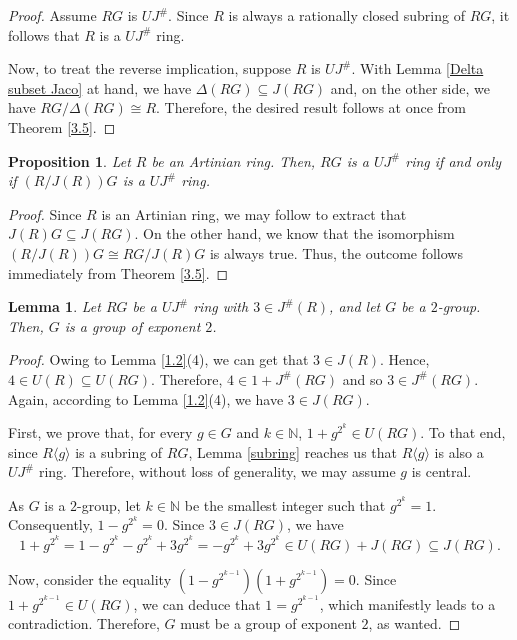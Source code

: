 \documentclass[12pt]{amsart}
\newtheorem{proposition}[theorem]{Proposition}
\newtheorem{lemma}[theorem]{Lemma}
\theoremstyle{definition}
\begin{document}
\begin{proof}
Assume $RG$ is $UJ^{\#}$. Since $R$ is always a rationally closed subring of $RG$, it follows that $R$ is a $UJ^{\#}$ ring. 

Now, to treat the reverse implication, suppose $R$ is $UJ^{\#}$. With Lemma \ref{Delta subset Jaco} at hand, we have $\Delta(RG) \subseteq J(RG)$ and, on the other side, we have $RG/\Delta(RG) \cong R$. Therefore, the desired result follows at once from Theorem \ref{3.5}.
\end{proof}

\begin{proposition}
Let $R$ be an Artinian ring. Then, $RG$ is a $UJ^{\#}$ ring if and only if $(R/J(R))G$ is a $UJ^{\#}$ ring.
\end{proposition}

\begin{proof}
Since $R$ is an Artinian ring, we may follow \cite[Proposition 3]{con} to extract that $J(R)G\subseteq J(RG)$. On the other hand, we know that the isomorphism $(R/J(R))G\cong RG/J(R)G$ is always true. Thus, the outcome follows immediately from Theorem \ref {3.5}.
\end{proof}

\begin{lemma}
Let $RG$ be a $UJ^{\#}$ ring with $3 \in J^{\#}(R)$, and let $G$ be a $2$-group. Then, $G$ is a group of exponent $2$.
\end{lemma}

\begin{proof}
Owing to Lemma \ref{1.2}(4), we can get that $3 \in J(R)$. Hence, $4\in U(R)\subseteq U(RG)$. Therefore, $4\in 1+J^{\#}(RG)$ and so $3\in J^{\#}(RG)$. Again, according to Lemma \ref{1.2}(4), we have $3\in J(RG)$.
	
First, we prove that, for every $g \in G$ and $k \in \mathbb{N}$, $1+g^{2^k} \in U(RG)$. To that end, since $R\langle g\rangle$ is a subring of $RG$, Lemma \ref{subring} reaches us that $R\langle g\rangle$ is also a $UJ^{\#}$ ring. Therefore, without loss of generality, we may assume $g$ is central.
	
As $G$ is a $2$-group, let $k \in \mathbb{N}$ be the smallest integer such that $g^{2^k}=1$. Consequently, $1-g^{2^k}=0$. Since $3 \in J(RG)$, we have
\[
	1+g^{2^k} = 1-g^{2^k} - g^{2^k} + 3g^{2^k} = -g^{2^k} + 3g^{2^k} \in U(RG) + J(RG) \subseteq J(RG).
\]
	
Now, consider the equality $(1-g^{2^{k-1}})(1+g^{2^{k-1}})=0$. Since $1+g^{2^{k-1}} \in U(RG)$, we can deduce that $1=g^{2^{k-1}}$, which manifestly leads to a contradiction. Therefore, $G$ must be a group of exponent $2$, as wanted.
\end{proof}
\end{document}
